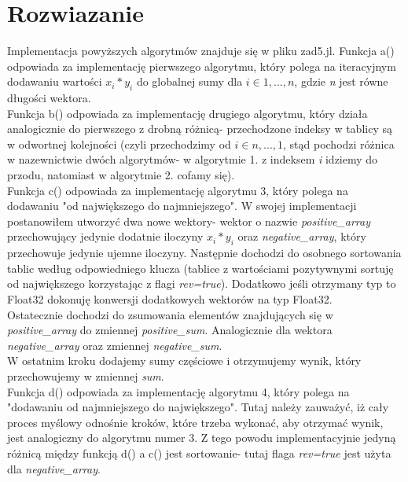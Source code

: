 \documentclass[a4paper,14pt]{report}
\begin{document}
\section{Rozwiazanie}
Implementacja powyższych algorytmów znajduje się w pliku zad5.jl.
Funkcja a() odpowiada za implementację pierwszego algorytmu, który polega na iteracyjnym dodawaniu wartości $x_{i} * y_{i} $ do globalnej sumy dla $i \in {1,...,n} $, gdzie \textit{n} jest równe długości wektora. \\
Funkcja b() odpowiada za implementację drugiego algorytmu, który działa analogicznie do pierwszego z drobną różnicą- przechodzone indeksy w tablicy są w odwortnej kolejności (czyli przechodzimy od $i \in {n,...,1} $, stąd pochodzi różnica w nazewnictwie dwóch algorytmów- w algorytmie 1. z indeksem \textit{i} idziemy do przodu, natomiast w algorytmie 2. cofamy się). \\

Funkcja c() odpowiada za implementację algorytmu 3, który polega na dodawaniu "od największego do najmniejszego". W swojej implementacji postanowiłem utworzyć dwa nowe wektory- wektor o nazwie \textit{positive\_array} przechowujący jedynie dodatnie iloczyny $x_{i} * y_{i} $ oraz \textit{negative\_array}, który przechowuje jedynie ujemne iloczyny. Następnie dochodzi do osobnego sortowania tablic według odpowiedniego klucza (tablice z wartościami pozytywnymi sortuję od największego korzystając z flagi \textit{rev=true}). Dodatkowo jeśli otrzymany typ to Float32 dokonuję konwersji dodatkowych wektorów na typ Float32. \\
Ostatecznie dochodzi do zsumowania elementów znajdujących się w \textit{positive\_array} do zmiennej \textit{positive\_sum}. Analogicznie dla wektora \textit{negative\_array} oraz zmiennej \textit{negative\_sum}. \\
W ostatnim kroku dodajemy sumy częściowe i otrzymujemy wynik, który przechowujemy w zmiennej \textit{sum}. \\

Funkcja d() odpowiada za implementację algorytmu 4, który polega na "dodawaniu od najmniejszego do największego". Tutaj należy zauważyć, iż cały proces myślowy odnośnie kroków, które trzeba wykonać, aby otrzymać wynik, jest analogiczny do algorytmu numer 3. Z tego powodu implementacyjnie jedyną różnicą między funkcją d() a c() jest sortowanie- tutaj flaga \textit{rev=true} jest użyta dla \textit{negative\_array}.
\end{document}
